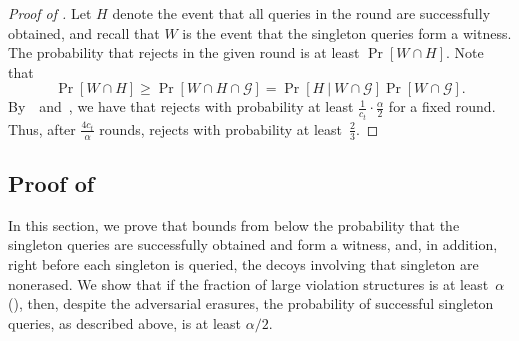 \documentclass{toc}
\begin{document}
\begin{proof}[Proof of ]
Let $H$ denote the event that all queries in the round are successfully obtained, and recall that $W$ is the event that the singleton queries form a witness. The probability that  rejects in the given round is at least $\Pr[W \cap H]$. Note that
\begin{equation*}
    \Pr[W \cap H] \geq \Pr[W \cap H \cap \mathcal{G}] = \Pr[H \:|\: W \cap \mathcal{G}]\Pr[W \cap \mathcal{G}].
\end{equation*} By~~and~, we have that  rejects with probability at least $\frac{1}{c_t} \cdot \frac{\alpha}{2}$ for a fixed round. Thus, after $\frac{4c_t}{\alpha}$ rounds,  rejects with probability at least~$\frac{2}{3}$. 
\end{proof}



\subsection{Proof of } \label{sec:lem_witness}

In this section, we prove  that bounds from below the probability that the singleton queries are successfully obtained and form a witness, and, in addition, right before each singleton is queried, the decoys involving that singleton are nonerased. We show that if the fraction of large violation structures is at least~$\alpha$ (), then, despite the adversarial erasures, the probability of successful singleton queries, as described above, is at least $\alpha/2$.
\end{document}
